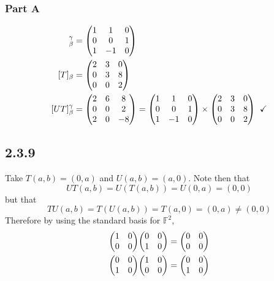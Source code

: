 \documentclass[12pt,titlepage]{extarticle}
\begin{document}
\subsubsection*{Part A}
\begin{align*}
    [U]_{\beta}^{\gamma} &= \mqty(
        1 & 1  & 0 \\
        0 & 0  & 1 \\
        1 & -1 & 0 \\
    ) \\
    [T]_{\beta} &= \mqty(
        2 & 3 & 0 \\
        0 & 3 & 8 \\
        0 & 0 & 2 \\
    ) \\
    [UT]_{\beta}^\gamma &= \mqty(
        2 & 6 & 8 \\
        0 & 0 & 2 \\
        2 & 0 & -8 \\
    ) = \mqty(
        1 & 1  & 0 \\
        0 & 0  & 1 \\
        1 & -1 & 0 \\
    ) \times \mqty(
        2 & 3 & 0 \\
        0 & 3 & 8 \\
        0 & 0 & 2 \\
    ) \;\; \checkmark
\end{align*}

\subsection*{2.3.9}
Take $T(a, b) = (0, a)$ and $U(a,b) = (a, 0)$. Note then that
\[
    UT(a,b) = U(T(a,b)) = U(0,a) = (0,0)
\]
but that
\[
    TU(a,b) = T(U(a,b)) = T(a,0) = (0, a) \neq (0,0)
\]
Therefore by using the standard basis for $\mathbb{F}^2$,
\begin{align*}
    \mqty(
    1 & 0 \\
    0 & 0 \\
    )
    \mqty(
    0 & 0 \\
    1 & 0 \\
    ) &= \mqty(
    0 & 0 \\  
    0 & 0 \\  
    ) \\
    \mqty(
    0 & 0 \\
    1 & 0 \\
    )
    \mqty(
    1 & 0 \\
    0 & 0 \\
    ) &= \mqty(
    0 & 0 \\  
    1 & 0 \\  
    ) \\
\end{align*}
\end{document}
